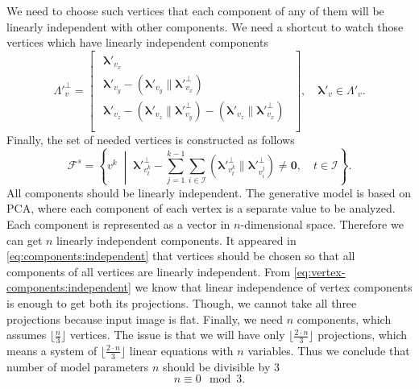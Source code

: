 We need to choose such vertices that each component of any of them
will be linearly independent with other components.
We need a shortcut to watch those vertices
which have linearly independent components
\begin{equation*}
  \Lambda'^{\perp}_v = \begin{bmatrix}
    \begin{aligned}
      \pmb{\lambda}'_{v_x} \\
      \pmb{\lambda}'_{v_y}
        - \left( \pmb{\lambda}'_{v_y} \parallel \pmb{\lambda}'^{\perp}_{v_x} \right) \\
      \pmb{\lambda}'_{v_z}
        - \left( \pmb{\lambda}'_{v_z} \parallel \pmb{\lambda}'^{\perp}_{v_y} \right)
        - \left( \pmb{\lambda}'_{v_z} \parallel \pmb{\lambda}'^{\perp}_{v_x} \right) \\
    \end{aligned}
  \end{bmatrix},
  \quad \pmb{\lambda}'_v \in \Lambda'_v.
\end{equation*}
Finally, the set of needed vertices is constructed as follows
\begin{equation*}
  \mathcal{F}^s
  = \left\{ v^k \;\middle|\;
    \pmb{\lambda}'^{\perp}_{v^k_t}
    - \sum_{j = 1}^{k - 1} \sum_{i \in \mathcal{I}}
      \left( \pmb{\lambda}'^{\perp}_{v^k_t}
             \parallel \pmb{\lambda}'^{\perp}_{v^j_i} \right)
    \neq \pmb{0},
    \quad t \in \mathcal{I}
  \right\}.
\end{equation*}
All components should be linearly independent.
The generative model is based on PCA,
where each component of each vertex is a separate value to be analyzed.
Each component is represented as a vector in $n$-dimensional space.
Therefore we can get $n$ linearly independent components.
It appeared in \eqref{eq:components:independent}
that vertices should be chosen so that
all components of all vertices are linearly independent.
From \eqref{eq:vertex-components:independent} we know
that linear independence of vertex components
is enough to get both its projections.
Though, we cannot take all three projections because input image is flat.
Finally, we need $n$ components,
which assumes $\lfloor \frac{n}{3} \rfloor$ vertices.
The issue is that we will have only $\lfloor \frac{2 \cdot n}{3} \rfloor$
projections,
which means a system of $\lfloor \frac{2 \cdot n}{3} \rfloor$ linear equations
with $n$ variables.
Thus we conclude
that number of model parameters $n$ should be divisible by $3$
\begin{equation*}
  n \equiv 0 \mod 3.
\end{equation*}
